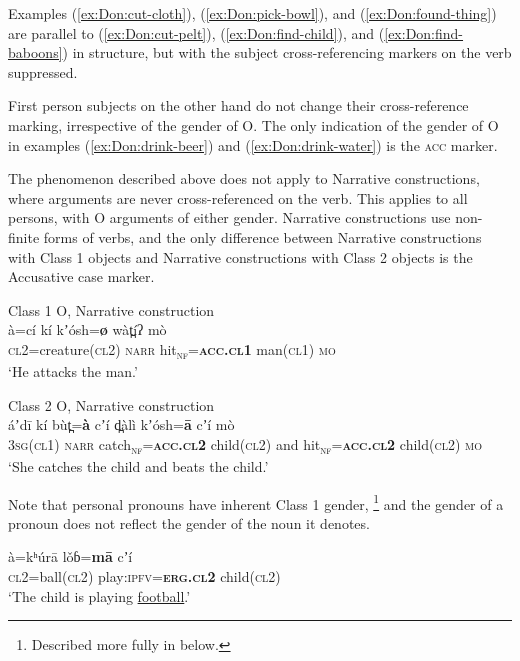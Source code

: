 \documentclass[output=collectionpaper,hidelinks]{langscibook}
\theoremstyle{remark}
\begin{document}
Examples (\ref{ex:Don:cut-cloth}), (\ref{ex:Don:pick-bowl}), and
(\ref{ex:Don:found-thing}) are parallel to (\ref{ex:Don:cut-pelt}), (\ref{ex:Don:find-child}), and (\ref{ex:Don:find-baboons}) in structure, but
with the subject cross-referencing markers on the verb suppressed.

First person subjects on the other hand do not change their cross-reference
marking, irrespective of the gender of O.  The only indication of the gender of
O in examples (\ref{ex:Don:drink-beer}) and (\ref{ex:Don:drink-water}) is the \textsc{acc} marker.

The phenomenon described above does not apply to Narrative constructions, where
arguments are never cross-referenced on the verb. This applies to all persons, with O arguments of either gender. Narrative constructions use
non-finite forms of verbs, and the only difference between Narrative
constructions with Class 1 objects and Narrative constructions with Class 2
objects is the Accusative case marker.


\ea
 Class 1 O, Narrative construction \\
\gll à=cí kí kʼósh=\textbf{ø} wàt̪íʔ mò \\
 \textsc{cl2}=creature(\textsc{cl2}) \textsc{narr} hit\textsubscript{\textsc{nf}}=\textbf{\textsc{acc.cl1}} man(\textsc{cl1}) \textsc{mo} \\
\glt `He attacks the man.' \\
\z


\ea
 Class 2 O, Narrative construction \\
\gll áʼdī kí bùt̪=\textbf{à} cʼí d̪àlì kʼósh=\textbf{ā} cʼí mò \\
 \textsc{3sg}(\textsc{cl1}) \textsc{narr} catch\textsubscript{\textsc{nf}}=\textbf{\textsc{acc.cl2}} child(\textsc{cl2}) and hit\textsubscript{\textsc{nf}}=\textbf{\textsc{acc.cl2}} child(\textsc{cl2}) \textsc{mo} \\
\glt `She catches the child and beats the child.' \\
\z

Note that personal pronouns have inherent Class 1 gender,%
\footnote{Described more fully in  below.} %
and the gender of a pronoun does not reflect the gender of the noun it denotes.

\ea
\gll  à=kʰúrā lǒɓ=\textbf{mā} cʼí \\
 \textsc{cl2}=ball(\textsc{cl2}) play:\textsc{ipfv}=\textbf{\textsc{erg.cl2}} child(\textsc{cl2}) \\
\glt `The child is playing \uline{football}.' \\
\z
\end{document}

